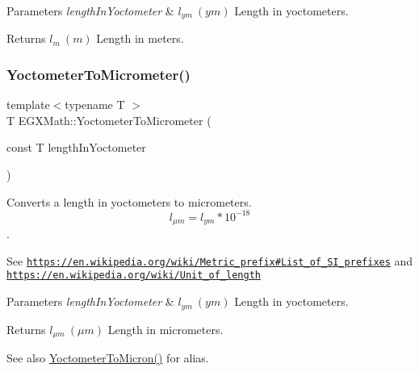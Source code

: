 \begin{DoxyParams}{Parameters}
{\em length\+In\+Yoctometer} & $ l_{ym}\ (ym)$ Length in yoctometers. \\
\hline
\end{DoxyParams}
\begin{DoxyReturn}{Returns}
$ l_{m}\ (m)$ Length in meters. 
\end{DoxyReturn}
\mbox{\label{group___e_g_x_math-_conversions-_length_conversions-_s_i-_yoctometer-_s_i_ga910145f68803fbaa87afd1d30d48c96e}} 
\subsubsection{\texorpdfstring{Yoctometer\+To\+Micrometer()}{YoctometerToMicrometer()}}
{\footnotesize\ttfamily template$<$typename T $>$ \\
T E\+G\+X\+Math\+::\+Yoctometer\+To\+Micrometer (\begin{DoxyParamCaption}\item[{const T}]{length\+In\+Yoctometer }\end{DoxyParamCaption})}



Converts a length in yoctometers to micrometers. \[ l_{\mu m}=l_{ym} * 10^{-18} \]. 

See \href{https://en.wikipedia.org/wiki/Metric_prefix#List_of_SI_prefixes}{\tt https\+://en.\+wikipedia.\+org/wiki/\+Metric\+\_\+prefix\#\+List\+\_\+of\+\_\+\+S\+I\+\_\+prefixes} and \href{https://en.wikipedia.org/wiki/Unit_of_length}{\tt https\+://en.\+wikipedia.\+org/wiki/\+Unit\+\_\+of\+\_\+length} 
\begin{DoxyParams}{Parameters}
{\em length\+In\+Yoctometer} & $ l_{ym}\ (ym)$ Length in yoctometers. \\
\hline
\end{DoxyParams}
\begin{DoxyReturn}{Returns}
$ l_{\mu m}\ (\mu m)$ Length in micrometers. 
\end{DoxyReturn}
\begin{DoxySeeAlso}{See also}
\mbox{\hyperlink{group___e_g_x_math-_conversions-_length_conversions-_s_i-_yoctometer-_non-_s_i_ga4863fe4d5268ab023ec32d0281171b55}{Yoctometer\+To\+Micron()}} for alias. 
\end{DoxySeeAlso}
\mbox{\label{group___e_g_x_math-_conversions-_length_conversions-_s_i-_yoctometer-_s_i_ga599936dd87aba0a05d16c0c5992928ca}} 
